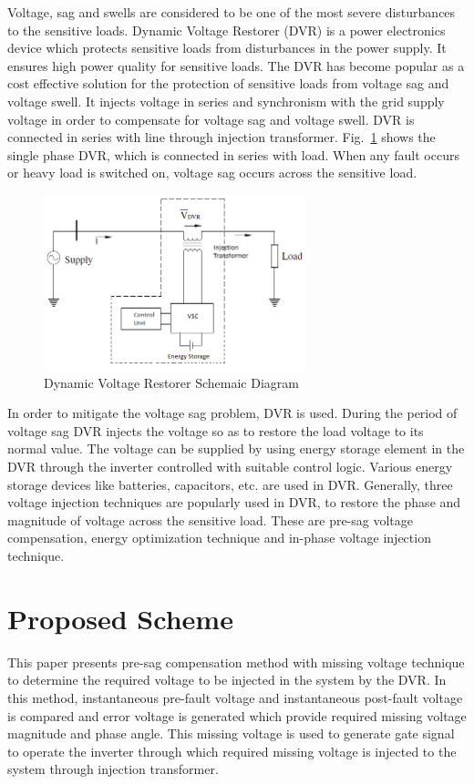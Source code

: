 \documentclass[journal,twoside]{IEEEtran}
\begin{document}
\bigskip
Voltage, sag and swells are considered to be one of the most severe disturbances to the sensitive loads. Dynamic Voltage Restorer (DVR) is a power electronics device which protects sensitive loads from disturbances in the power supply. It ensures high power quality for sensitive loads. The DVR has become popular as a cost effective solution for the protection of sensitive loads from voltage sag and voltage swell. It injects voltage in series and synchronism with the grid supply voltage in order to compensate for voltage sag and voltage swell. DVR is connected in series with line through injection transformer. Fig.~\ref{f1} shows the single phase DVR, which is connected in series with load. When any fault occurs or heavy load is switched on, voltage sag occurs across the sensitive load.
\begin{figure}[!ht]
\centering
\includegraphics[width=3in]{1}
\caption{Dynamic Voltage Restorer Schemaic Diagram}
\label{f1}
\end{figure}
\bigskip
In order to mitigate the voltage sag problem, DVR is used. During the period of voltage sag DVR injects the voltage so as to restore the load voltage to its normal value. The voltage can be supplied by using energy
storage element in the DVR through the inverter controlled with suitable control logic. Various energy storage devices like batteries, capacitors, etc. are used in DVR. Generally, three voltage injection techniques are popularly used in DVR, to restore the phase and magnitude of voltage across the sensitive load. These are pre-sag voltage compensation, energy optimization technique and in-phase voltage injection technique.



\section{Proposed Scheme}
This paper presents pre-sag compensation method with missing voltage technique to determine the required voltage to be injected in the system by the DVR. In this method, instantaneous pre-fault voltage and instantaneous post-fault voltage is compared and error voltage is generated which provide required missing voltage magnitude and phase angle. This missing voltage is used to generate gate signal to operate the inverter through which required missing voltage is injected to the system through injection transformer. 
\end{document}
